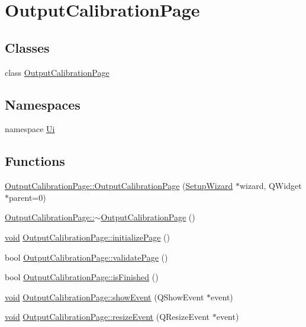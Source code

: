 \hypertarget{group___output_calibration_page}{\section{\-Output\-Calibration\-Page}
\label{group___output_calibration_page}
}
\subsection*{\-Classes}
\begin{DoxyCompactItemize}
\item 
class \hyperlink{class_output_calibration_page}{\-Output\-Calibration\-Page}
\end{DoxyCompactItemize}
\subsection*{\-Namespaces}
\begin{DoxyCompactItemize}
\item 
namespace \hyperlink{namespace_ui}{\-Ui}
\end{DoxyCompactItemize}
\subsection*{\-Functions}
\begin{DoxyCompactItemize}
\item 
\hyperlink{group___output_calibration_page_ga4975a50caf4226865af2d1d03e0fe82c}{\-Output\-Calibration\-Page\-::\-Output\-Calibration\-Page} (\hyperlink{class_setup_wizard}{\-Setup\-Wizard} $\ast$wizard, \-Q\-Widget $\ast$parent=0)
\item 
\hyperlink{group___output_calibration_page_ga4869b75d9c4a4506853c6901d70fa8cd}{\-Output\-Calibration\-Page\-::$\sim$\-Output\-Calibration\-Page} ()
\item 
\hyperlink{group___u_a_v_objects_plugin_ga444cf2ff3f0ecbe028adce838d373f5c}{void} \hyperlink{group___output_calibration_page_ga24bab144119d2bf977e40d7f33d16121}{\-Output\-Calibration\-Page\-::initialize\-Page} ()
\item 
bool \hyperlink{group___output_calibration_page_ga3e208c77155e8ab46a19849174aae3b6}{\-Output\-Calibration\-Page\-::validate\-Page} ()
\item 
bool \hyperlink{group___output_calibration_page_ga05fb534babe43fa9477a9d2ab14f5fbf}{\-Output\-Calibration\-Page\-::is\-Finished} ()
\item 
\hyperlink{group___u_a_v_objects_plugin_ga444cf2ff3f0ecbe028adce838d373f5c}{void} \hyperlink{group___output_calibration_page_gaccfd0563f0faafb93bacafa8cf873035}{\-Output\-Calibration\-Page\-::show\-Event} (\-Q\-Show\-Event $\ast$event)
\item 
\hyperlink{group___u_a_v_objects_plugin_ga444cf2ff3f0ecbe028adce838d373f5c}{void} \hyperlink{group___output_calibration_page_gafa4831a5e77c0a3a03ad4e5869d4d601}{\-Output\-Calibration\-Page\-::resize\-Event} (\-Q\-Resize\-Event $\ast$event)
\end{DoxyCompactItemize}
